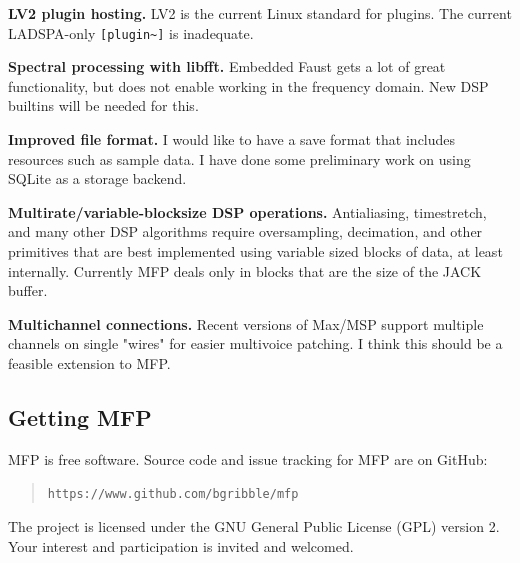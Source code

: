 \documentclass[a4paper]{article}
\begin{document}
{\bf LV2 plugin hosting.} LV2 is the current Linux standard for
plugins. The current LADSPA-only {\tt [plugin\textasciitilde]} is inadequate.

{\bf Spectral processing with libfft.} Embedded Faust gets a lot
of great functionality, but does not enable working in the
frequency domain. New DSP builtins will be needed for this.

{\bf Improved file format.} I would like to have a save format
that includes resources such as sample data. I have done some
preliminary work on using SQLite as a storage backend.

{\bf Multirate/variable-blocksize DSP operations.} Antialiasing,
timestretch, and many other DSP algorithms require oversampling,
decimation, and other primitives that are best implemented using
variable sized blocks of data, at least internally. Currently MFP
deals only in blocks that are the size of the JACK buffer.

{\bf Multichannel connections.} Recent versions of Max/MSP
support multiple channels on single "wires" for easier multivoice
patching. I think this should be a feasible extension to MFP.


\subsection{Getting MFP}

MFP is free software. Source code and issue tracking for MFP are on GitHub:

\begin{quote}
\texttt{https://www.github.com/bgribble/mfp}
\end{quote}

The project is licensed under the GNU General Public License (GPL) version
2. Your interest and participation is invited and welcomed.

\nocite{*}


\end{document}
